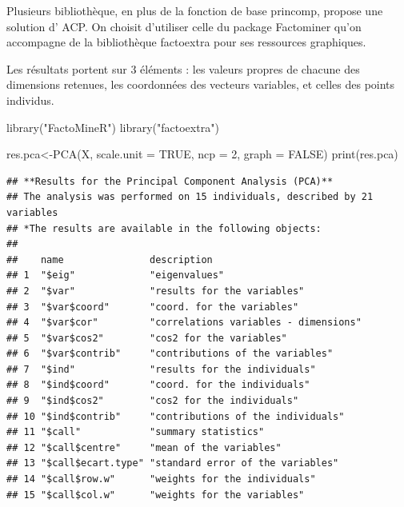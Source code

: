 \documentclass[
]{book}
\newenvironment{Shaded}{\begin{snugshade}}{\end{snugshade}}
\newcommand{\AttributeTok}[1]{\textcolor[rgb]{0.77,0.63,0.00}{#1}}
\newcommand{\ConstantTok}[1]{\textcolor[rgb]{0.00,0.00,0.00}{#1}}
\newcommand{\DecValTok}[1]{\textcolor[rgb]{0.00,0.00,0.81}{#1}}
\newcommand{\FunctionTok}[1]{\textcolor[rgb]{0.00,0.00,0.00}{#1}}
\newcommand{\NormalTok}[1]{#1}
\newcommand{\OtherTok}[1]{\textcolor[rgb]{0.56,0.35,0.01}{#1}}
\newcommand{\SpecialCharTok}[1]{\textcolor[rgb]{0.00,0.00,0.00}{#1}}
\newcommand{\StringTok}[1]{\textcolor[rgb]{0.31,0.60,0.02}{#1}}
\begin{document}
Plusieurs bibliothèque, en plus de la fonction de base princomp, propose une solution d' ACP. On choisit d'utiliser celle du package Factominer qu'on accompagne de la bibliothèque factoextra pour ses ressources graphiques.

Les résultats portent sur 3 éléments : les valeurs propres de chacune des dimensions retenues, les coordonnées des vecteurs variables, et celles des points individus.

\begin{Shaded}
\begin{Highlighting}[]
\FunctionTok{library}\NormalTok{(}\StringTok{"FactoMineR"}\NormalTok{)}
\FunctionTok{library}\NormalTok{(}\StringTok{"factoextra"}\NormalTok{)}

\NormalTok{res.pca}\OtherTok{\textless{}{-}}\FunctionTok{PCA}\NormalTok{(X, }\AttributeTok{scale.unit =} \ConstantTok{TRUE}\NormalTok{, }\AttributeTok{ncp =} \DecValTok{2}\NormalTok{, }\AttributeTok{graph =} \ConstantTok{FALSE}\NormalTok{)}
\FunctionTok{print}\NormalTok{(res.pca)}
\end{Highlighting}
\end{Shaded}

\begin{verbatim}
## **Results for the Principal Component Analysis (PCA)**
## The analysis was performed on 15 individuals, described by 21 variables
## *The results are available in the following objects:
## 
##    name               description                          
## 1  "$eig"             "eigenvalues"                        
## 2  "$var"             "results for the variables"          
## 3  "$var$coord"       "coord. for the variables"           
## 4  "$var$cor"         "correlations variables - dimensions"
## 5  "$var$cos2"        "cos2 for the variables"             
## 6  "$var$contrib"     "contributions of the variables"     
## 7  "$ind"             "results for the individuals"        
## 8  "$ind$coord"       "coord. for the individuals"         
## 9  "$ind$cos2"        "cos2 for the individuals"           
## 10 "$ind$contrib"     "contributions of the individuals"   
## 11 "$call"            "summary statistics"                 
## 12 "$call$centre"     "mean of the variables"              
## 13 "$call$ecart.type" "standard error of the variables"    
## 14 "$call$row.w"      "weights for the individuals"        
## 15 "$call$col.w"      "weights for the variables"
\end{verbatim}

\begin{Shaded}
\end{Shaded}
\end{document}
